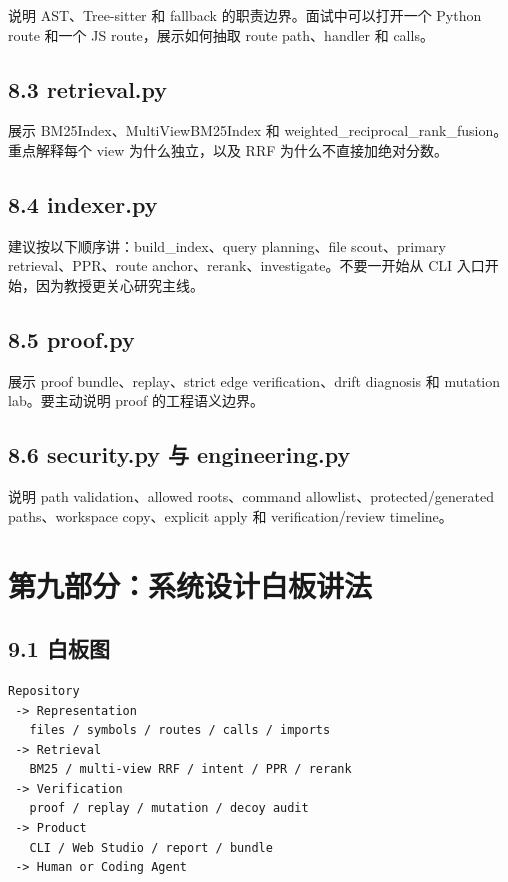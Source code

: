 \documentclass[UTF8,12pt,openany]{ctexbook}
\begin{document}
说明 AST、Tree-sitter 和 fallback 的职责边界。面试中可以打开一个 Python route 和一个 JS route，展示如何抽取 route path、handler 和 calls。\par

\section{8.3 retrieval.py}

展示 BM25Index、MultiViewBM25Index 和 weighted\_reciprocal\_rank\_fusion。重点解释每个 view 为什么独立，以及 RRF 为什么不直接加绝对分数。\par

\section{8.4 indexer.py}

建议按以下顺序讲：build\_index、query planning、file scout、primary retrieval、PPR、route anchor、rerank、investigate。不要一开始从 CLI 入口开始，因为教授更关心研究主线。\par

\section{8.5 proof.py}

展示 proof bundle、replay、strict edge verification、drift diagnosis 和 mutation lab。要主动说明 proof 的工程语义边界。\par

\section{8.6 security.py 与 engineering.py}

说明 path validation、allowed roots、command allowlist、protected/generated paths、workspace copy、explicit apply 和 verification/review timeline。\par

\clearpage
\chapter{第九部分：系统设计白板讲法}

\section{9.1 白板图}

\begin{lstlisting}
Repository
 -> Representation
   files / symbols / routes / calls / imports
 -> Retrieval
   BM25 / multi-view RRF / intent / PPR / rerank
 -> Verification
   proof / replay / mutation / decoy audit
 -> Product
   CLI / Web Studio / report / bundle
 -> Human or Coding Agent
\end{lstlisting}
\end{document}
